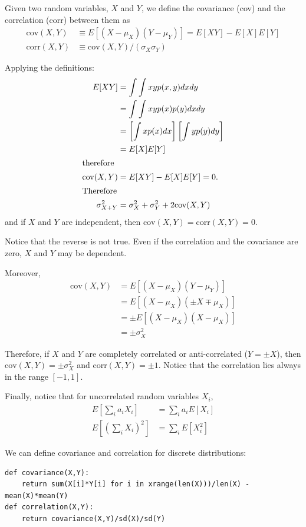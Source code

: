 \documentclass[justified,sixbynine]{tufte-book}
\def\ft{\small\tt}
\theoremstyle{plain}%
\theoremstyle{definition}
\theoremstyle{remark}
\begin{document}
\begin{fullwidth}
Given two random variables, $X$ and $Y$, we define the covariance (cov)  and the correlation (corr)
between
them as
\begin{align}
\textrm{cov}(X,Y) &\equiv  E[(X-\mu _X)(Y-\mu _Y)]=E[XY]-E[X]E[Y] \\
\textrm{corr}(X,Y) &\equiv  \textrm{cov}(X,Y)/(\sigma_X \sigma_Y)
\end{align}

Applying the definitions:
\begin{align}
E[XY] &=\int \int xyp(x,y)dxdy \\
&=\int \int xyp(x)p(y)dxdy \\
&=\left[ \int xp(x)dx\right] \left[ \int yp(y)dy\right] \\
&=E[X]E[Y] \\
\intertext{therefore}
\textrm{cov}(X,Y) &=E[XY]-E[X]E[Y]=0. \\
\intertext{Therefore}
\sigma _{X+Y}^2&=\sigma _X^2+\sigma _Y^2+2 \textrm{cov}(X,Y)
\end{align}
and if $X$ and $Y$ are independent, then $\textrm{cov}(X,Y)=\textrm{corr}(X,Y)=0$.

Notice that the reverse is not true. Even if the correlation and the covariance are zero, $X$ and $Y$ may be dependent.

Moreover,
\begin{align}
\textrm{cov}(X,Y) &=E[(X-\mu _X)(Y-\mu _Y)] \\
&=E[(X-\mu _X)(\pm X\mp \mu _X)] \\
&=\pm E[(X-\mu _X)(X-\mu _X)] \\
&=\pm \sigma _X^2
\end{align}

Therefore, if $X$ and $Y$ are completely correlated or anti-correlated ($Y=\pm X$), then $\textrm{cov}(X,Y)=\pm \sigma _X^2$ and $\textrm{corr}(X,Y) = \pm 1$.
Notice that the correlation lies always in the range $[-1,1]$.

Finally, notice that for uncorrelated random variables $X_i$,
\begin{align}
E[\sum_ia_iX_i] &=\sum_ia_iE[X_i] \\
E[(\sum_iX_i)^2] &=\sum_iE[X_i^2]
\end{align}


We can define covariance and correlation for discrete distributions:
\begin{lstlisting}[caption={in file: {\ft nlib.py}}]
def covariance(X,Y):
    return sum(X[i]*Y[i] for i in xrange(len(X)))/len(X) - mean(X)*mean(Y)
def correlation(X,Y):
    return covariance(X,Y)/sd(X)/sd(Y)
\end{lstlisting}


\end{fullwidth}
\end{document}
